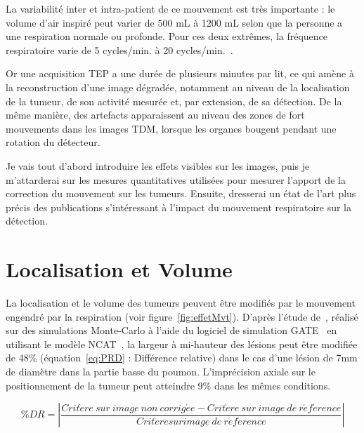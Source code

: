 La variabilité inter et intra-patient de ce mouvement est très importante : le volume d'air inspiré peut varier de 500 mL à 1200 mL selon que la personne a une respiration normale ou profonde. Pour ces deux extrêmes, la fréquence respiratoire varie de 5 cycles/min. à 20 cycles/min.~\cite{sherwood2006fundamentals}.

Or une acquisition TEP a une durée de plusieurs minutes par lit, ce qui amène à la reconstruction d'une image dégradée, notamment au niveau de la localisation de la tumeur, de son activité mesurée et, par extension, de sa détection. De la même manière, des artefacts apparaissent au niveau des zones de fort mouvements dans les images TDM, lorsque les organes bougent pendant une rotation du détecteur.

Je vais tout d'abord introduire les effets visibles sur les images, puis je m'attarderai sur les mesures quantitatives utilisées pour mesurer l'apport de la correction du mouvement sur les tumeurs. Ensuite, dresserai un état de l'art plus précis des publications s'intéressant à l'impact du mouvement respiratoire sur la détection.

\section{Localisation et Volume}


La localisation et le volume des tumeurs peuvent être modifiés par le mouvement engendré par la respiration (voir figure~\ref{fig:effetMvt}). D'après l'étude de~\cite{lamare2007respiratory}, réalisé sur des simulations Monte-Carlo à l'aide du logiciel de simulation GATE~\cite{jan2004gate} en utilisant le modèle NCAT~\cite{segars2001These}, la largeur à mi-hauteur des lésions peut être modifiée de 48\% (équation~\ref{eq:PRD} : Différence relative) dans le cas d'une lésion de 7mm de diamètre dans la partie basse du poumon. L'imprécision axiale sur le positionnement de la tumeur peut atteindre 9\% dans les mêmes conditions.

\begin{equation}
\%DR= \left| \frac{Crit\grave{e}re~sur~image~non~corrig\acute{e}e - Crit\grave{e}re~sur~image~de~r\acute{e}f\acute{e}rence}{Crit\grave{e}re sur image~de~r\acute{e}f\acute{e}rence} \right|
\label{eq:PRD}
\end{equation}


